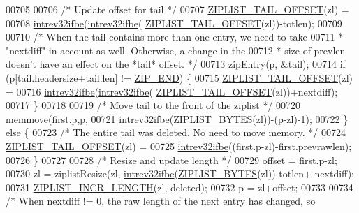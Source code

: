 \begin{DoxyCode}
{{00705 
00706             \textcolor{comment}{/* Update offset for tail */}
00707             \hyperlink{ziplist_8c_adf2235d74c81861c85fb5d2ffa209397}{ZIPLIST\_TAIL\_OFFSET}(zl) =
00708                 \hyperlink{endianconv_8h_a4e85d9ae58a3b1e6ceaabfd4689002c7}{intrev32ifbe}(\hyperlink{endianconv_8h_a4e85d9ae58a3b1e6ceaabfd4689002c7}{intrev32ifbe}(
      \hyperlink{ziplist_8c_adf2235d74c81861c85fb5d2ffa209397}{ZIPLIST\_TAIL\_OFFSET}(zl))-totlen);
00709 
00710             \textcolor{comment}{/* When the tail contains more than one entry, we need to take}
00711 \textcolor{comment}{             * "nextdiff" in account as well. Otherwise, a change in the}
00712 \textcolor{comment}{             * size of prevlen doesn't have an effect on the *tail* offset. */}
00713             zipEntry(p, &tail);
00714             \textcolor{keywordflow}{if} (p[tail.headersize+tail.len] != \hyperlink{ziplist_8c_a31a8f9d5b5bad75318741cfca5de5ea8}{ZIP\_END}) \{
00715                 \hyperlink{ziplist_8c_adf2235d74c81861c85fb5d2ffa209397}{ZIPLIST\_TAIL\_OFFSET}(zl) =
00716                    \hyperlink{endianconv_8h_a4e85d9ae58a3b1e6ceaabfd4689002c7}{intrev32ifbe}(\hyperlink{endianconv_8h_a4e85d9ae58a3b1e6ceaabfd4689002c7}{intrev32ifbe}(
      \hyperlink{ziplist_8c_adf2235d74c81861c85fb5d2ffa209397}{ZIPLIST\_TAIL\_OFFSET}(zl))+nextdiff);
00717             \}
00718 
00719             \textcolor{comment}{/* Move tail to the front of the ziplist */}
00720             memmove(first.p,p,
00721                 \hyperlink{endianconv_8h_a4e85d9ae58a3b1e6ceaabfd4689002c7}{intrev32ifbe}(\hyperlink{ziplist_8c_a28b9c7884758bc2d52f204903a4bb642}{ZIPLIST\_BYTES}(zl))-(p-zl)-1);
00722         \} \textcolor{keywordflow}{else} \{
00723             \textcolor{comment}{/* The entire tail was deleted. No need to move memory. */}
00724             \hyperlink{ziplist_8c_adf2235d74c81861c85fb5d2ffa209397}{ZIPLIST\_TAIL\_OFFSET}(zl) =
00725                 \hyperlink{endianconv_8h_a4e85d9ae58a3b1e6ceaabfd4689002c7}{intrev32ifbe}((first.p-zl)-first.prevrawlen);
00726         \}
00727 
00728         \textcolor{comment}{/* Resize and update length */}
00729         offset = first.p-zl;
00730         zl = ziplistResize(zl, \hyperlink{endianconv_8h_a4e85d9ae58a3b1e6ceaabfd4689002c7}{intrev32ifbe}(\hyperlink{ziplist_8c_a28b9c7884758bc2d52f204903a4bb642}{ZIPLIST\_BYTES}(zl))-totlen+
      nextdiff);
00731         \hyperlink{ziplist_8c_a929244a46d13b9b5e1007136d3922daf}{ZIPLIST\_INCR\_LENGTH}(zl,-deleted);
00732         p = zl+offset;
00733 
00734         \textcolor{comment}{/* When nextdiff != 0, the raw length of the next entry has changed, so}
}}
\end{DoxyCode}
